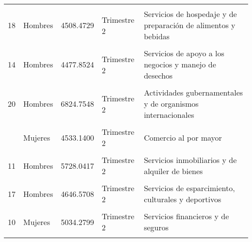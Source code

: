 \documentclass{article}
\begin{document}
\begin{table}[!h]
\begin{tabular}{rlrll}
\cellcolor{gray!10}{12} & \cellcolor{gray!10}{Hombres} & \cellcolor{gray!10}{5915.8233} & \cellcolor{gray!10}{Trimestre 2} & \cellcolor{gray!10}{Servicios profesionales, científicos y técnicos}\\
18 & Hombres & 4508.4729 & Trimestre 2 & Servicios de hospedaje y de preparación de alimentos y bebidas\\
\addlinespace
\cellcolor{gray!10}{16} & \cellcolor{gray!10}{Mujeres} & \cellcolor{gray!10}{5323.6202} & \cellcolor{gray!10}{Trimestre 2} & \cellcolor{gray!10}{Servicios de salud y de asistencia social}\\
14 & Hombres & 4477.8524 & Trimestre 2 & Servicios de apoyo a los negocios y manejo de desechos\\
\cellcolor{gray!10}{15} & \cellcolor{gray!10}{Hombres} & \cellcolor{gray!10}{6430.8340} & \cellcolor{gray!10}{Trimestre 2} & \cellcolor{gray!10}{Servicios educativos}\\
20 & Hombres & 6824.7548 & Trimestre 2 & Actividades gubernamentales y de organismos internacionales\\
\cellcolor{gray!10}{16} & \cellcolor{gray!10}{Hombres} & \cellcolor{gray!10}{6785.1356} & \cellcolor{gray!10}{Trimestre 2} & \cellcolor{gray!10}{Servicios de salud y de asistencia social}\\
\addlinespace
6 & Mujeres & 4533.1400 & Trimestre 2 & Comercio al por mayor\\
\cellcolor{gray!10}{11} & \cellcolor{gray!10}{Mujeres} & \cellcolor{gray!10}{4538.6288} & \cellcolor{gray!10}{Trimestre 2} & \cellcolor{gray!10}{Servicios inmobiliarios y de alquiler de bienes}\\
11 & Hombres & 5728.0417 & Trimestre 2 & Servicios inmobiliarios y de alquiler de bienes\\
\cellcolor{gray!10}{9} & \cellcolor{gray!10}{Hombres} & \cellcolor{gray!10}{5761.2417} & \cellcolor{gray!10}{Trimestre 2} & \cellcolor{gray!10}{Información en medios masivos}\\
17 & Hombres & 4646.5708 & Trimestre 2 & Servicios de esparcimiento, culturales y deportivos\\
\addlinespace
\cellcolor{gray!10}{10} & \cellcolor{gray!10}{Hombres} & \cellcolor{gray!10}{6502.0233} & \cellcolor{gray!10}{Trimestre 2} & \cellcolor{gray!10}{Servicios financieros y de seguros}\\
10 & Mujeres & 5034.2799 & Trimestre 2 & Servicios financieros y de seguros\\
\cellcolor{gray!10}{4} & \cellcolor{gray!10}{Mujeres} & \cellcolor{gray!10}{5596.1333} & \cellcolor{gray!10}{Trimestre 2} & \cellcolor{gray!10}{Construcción}\\

\end{tabular}
\end{table}
\end{document}
